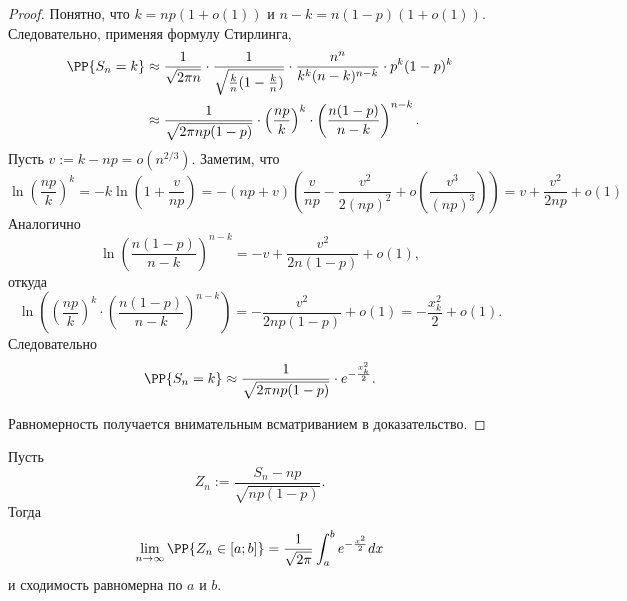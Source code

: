 \documentclass[12pt,a4paper]{article}
\begin{document}
    \begin{proof}
        Понятно, что $k = np(1 + o(1))$ и $n-k = n(1-p)(1 + o(1))$. Следовательно, применяя формулу Стирлинга,
        \begin{align*}
            \PP\{S_n = k\}
            &\approx \frac{1}{\sqrt{2\pi n}} \cdot \frac{1}{\sqrt{\frac{k}{n}(1-\frac{k}{n})}} \cdot \frac{n^n}{k^k(n-k)^{n-k}} \cdot p^k (1-p)^k\\
            &\approx \frac{1}{\sqrt{2\pi n p (1-p)}} \cdot \left(\frac{np}{k}\right)^k \cdot \left(\frac{n(1-p)}{n-k}\right)^{n-k}.
        \end{align*}
        Пусть $v := k - np = o(n^{2/3})$. Заметим, что
        \[
            \ln\left(\frac{np}{k}\right)^k
            = -k \ln\left(1 + \frac{v}{np}\right)
            = -(np + v)\left(\frac{v}{np} - \frac{v^2}{2(np)^2} + o\left(\frac{v^3}{(np)^3}\right)\right)
            = v + \frac{v^2}{2np} + o(1)
        \]
        Аналогично
        \[
            \ln\left(\frac{n(1-p)}{n-k}\right)^{n-k}
            = -v + \frac{v^2}{2n(1-p)} + o(1),
        \]
        откуда
        \[
            \ln\left(\left(\frac{np}{k}\right)^k \cdot \left(\frac{n(1-p)}{n-k}\right)^{n-k}\right)
            = -\frac{v^2}{2np(1-p)} + o(1)
            = -\frac{x_k^2}{2} + o(1).
        \]
        Следовательно
        \[\PP\{S_n = k\} \approx \frac{1}{\sqrt{2\pi n p (1-p)}} \cdot e^{-\frac{x_k^2}{2}}.\]

        Равномерность получается внимательным всматриванием в доказательство.
    \end{proof}

    \begin{theorem}
        Пусть
        \[Z_n := \frac{S_n - np}{\sqrt{np(1-p)}}.\]
        Тогда
        \[\lim_{n \to \infty} \PP\{Z_n \in [a; b]\} = \frac{1}{\sqrt{2\pi}} \int_a^b e^{-\frac{x^2}{2}} dx\]
        и сходимость равномерна по $a$ и $b$.
    \end{theorem}
\end{document}
